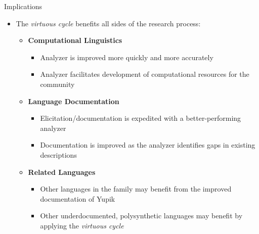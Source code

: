 \documentclass[usenames,dvipsnames]{beamer}
\begin{document}
\begin{frame}[fragile]
\begin{columns}[T]
\begin{column}{0.46\textwidth}
\begin{block}{Implications}
\begin{itemize}
    \item The \textit{virtuous cycle} benefits all sides of the research process:
        \vspace{18pt}
        \begin{itemize}
        \setlength\itemsep{18pt}
        
            \item \textbf{Computational Linguistics}
            \vspace{12pt}
            \begin{itemize}
            \setlength\itemsep{12pt}
                \item Analyzer is improved more quickly and more accurately
            
                \item Analyzer facilitates development of computational resources for the community
            \end{itemize}
        
             \item \textbf{Language Documentation}
            \vspace{12pt}
            \begin{itemize}
            \setlength\itemsep{12pt}
                \item Elicitation/documentation is expedited with a better-performing analyzer
            
                \item Documentation is improved as the analyzer identifies gaps in existing descriptions
            \end{itemize}
                
            \item \textbf{Related Languages}
            \vspace{12pt}
            \begin{itemize}
            \setlength\itemsep{18pt}
                \item Other languages in the family may benefit from the improved documentation of Yupik
                
                \item Other underdocumented, polysynthetic languages may benefit by applying the \textit{virtuous cycle}
            \end{itemize}
    \end{itemize}
\end{itemize}
\vspace*{12mm}
\end{block}
\end{column}


\end{columns}
\end{frame}
\end{document}
